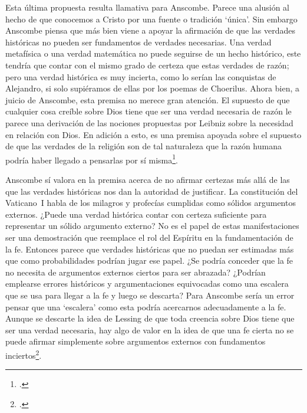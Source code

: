 Esta última propuesta resulta llamativa para Anscombe. Parece una alusión al hecho de que conocemos a Cristo por una fuente o tradición `única'. Sin embargo Anscombe piensa que más bien viene a apoyar la afirmación de que las verdades históricas no pueden ser fundamentos de verdades necesarias. Una verdad metafísica o una verdad matemática no puede seguirse de un hecho histórico, este tendría que contar con el mismo grado de certeza que estas verdades de razón; pero una verdad histórica es muy incierta, como lo serían las conquistas de Alejandro, si solo supiéramos de ellas por los poemas de Choerilus. Ahora bien, a juicio de Anscombe, esta premisa no merece gran atención. El supuesto de que cualquier cosa creíble sobre Dios tiene que ser una verdad necesaria de razón le parece una derivación de las nociones propuestas por Leibniz sobre la necesidad en relación con Dios. En adición a esto, es una premisa apoyada sobre el supuesto de que las verdades de la religión son de tal naturaleza que la razón humana podría haber llegado a pensarlas por sí misma\footnote{\cite[Cf.][23]{anscombe2008faith:prophandmi}.}.

Anscombe sí valora en la premisa acerca de no afirmar certezas más allá de las que las verdades históricas nos dan la autoridad de justificar. La constitución del Vaticano~I habla de los milagros y profecías cumplidas como sólidos argumentos externos. ¿Puede una verdad histórica contar con certeza suficiente para representar un sólido argumento externo? No es el papel de estas manifestaciones ser una demostración que reemplace el rol del Espíritu en la fundamentación de la fe. Entonces parece que verdades históricas que no puedan ser estimadas más que como probabilidades podrían jugar ese papel. ¿Se podría conceder que la fe no necesita de argumentos externos ciertos para ser abrazada? ¿Podrían emplearse errores históricos y argumentaciones equivocadas como una escalera que se usa para llegar a la fe y luego se descarta? Para Anscombe sería un error pensar que una `escalera' como esta podría acercarnos adecuadamente a la fe. Aunque se descarte la idea de Lessing de que toda creencia sobre Dios tiene que ser una verdad necesaria, hay algo de valor en la idea de que una fe cierta no se puede afirmar simplemente sobre argumentos externos con fundamentos inciertos\footnote{\cite[Cf.][23-24]{anscombe2008faith:prophandmi}.}.

